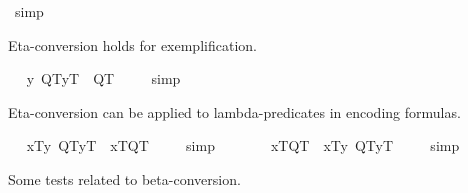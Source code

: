 \begin{isabellebody}
\ simp\ \isamarkupfalse%
%
\endisatagproof
{\isafoldproof}%
%
\isadelimproof
%
\endisadelimproof
%
\begin{isamarkuptext}%
Eta-conversion holds for exemplification.%
\end{isamarkuptext}\isamarkuptrue%
\ \isamarkupfalse%
\ {\isachardoublequoteopen}{\isacharbrackleft}{\isacharparenleft}\isactrlbold {\isasymlambda}y{\isachardot}\ {\isasymlparr}Q\isactrlsup T{\isacharcomma}y\isactrlsup T{\isasymrparr}{\isacharparenright}\ \isactrlbold {\isacharequal}\ Q\isactrlsup T{\isacharbrackright}\ {\isacharequal}\ {\isasymtop}{\isachardoublequoteclose}%
\isadelimproof
\ %
\endisadelimproof
%
\isatagproof
{}\isamarkupfalse%
\ simp\ \isamarkupfalse%
%
\endisatagproof
{\isafoldproof}%
%
\isadelimproof
%
\endisadelimproof
%
\begin{isamarkuptext}%
Eta-conversion can be applied to lambda-predicates in encoding formulas.%
\end{isamarkuptext}\isamarkuptrue%
\ \isamarkupfalse%
\ {\isachardoublequoteopen}{\isacharbrackleft}{\isasymlbrace}x\isactrlsup T{\isacharcomma}{\isacharparenleft}\isactrlbold {\isasymlambda}y{\isachardot}\ {\isasymlparr}Q\isactrlsup T{\isacharcomma}y\isactrlsup T{\isasymrparr}{\isacharparenright}{\isasymrbrace}\ \isactrlbold {\isasymrightarrow}\ {\isasymlbrace}x\isactrlsup T{\isacharcomma}Q\isactrlsup T{\isasymrbrace}{\isacharbrackright}\ {\isacharequal}\ {\isasymtop}{\isachardoublequoteclose}%
\isadelimproof
\ %
\endisadelimproof
%
\isatagproof
{}\isamarkupfalse%
\ simp\ \isamarkupfalse%
%
\endisatagproof
{\isafoldproof}%
%
\isadelimproof
%
\endisadelimproof
\ \ \ \isanewline
\ \isamarkupfalse%
\ {\isachardoublequoteopen}{\isacharbrackleft}{\isasymlbrace}x\isactrlsup T{\isacharcomma}Q\isactrlsup T{\isasymrbrace}\ \isactrlbold {\isasymrightarrow}\ {\isasymlbrace}x\isactrlsup T{\isacharcomma}{\isacharparenleft}\isactrlbold {\isasymlambda}y{\isachardot}\ {\isasymlparr}Q\isactrlsup T{\isacharcomma}y\isactrlsup T{\isasymrparr}{\isacharparenright}{\isasymrbrace}{\isacharbrackright}\ {\isacharequal}\ {\isasymtop}{\isachardoublequoteclose}%
\isadelimproof
\ %
\endisadelimproof
%
\isatagproof
{}\isamarkupfalse%
\ simp\ \isamarkupfalse%
%
\endisatagproof
{\isafoldproof}%
%
\isadelimproof
%
\endisadelimproof
%
\begin{isamarkuptext}%
Some tests related to beta-conversion.%
\end{isamarkuptext}\isamarkuptrue%

\end{isabellebody}
